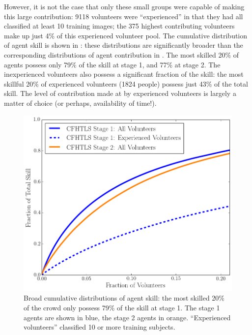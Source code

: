 \documentclass[useAMS,usenatbib,a4paper]{mn2e}
\begin{document}
However, it is not the case that only these small groups were capable of
making this large contribution: 9118 volunteers were ``experienced'' in that
they had all classified at least 10 training images; the 375 highest
contributing volunteers make up just 4\% of this experienced volunteer pool.
The cumulative distribution of agent skill is shown in
: these distributions are significantly broader
than the corresponding distributions of agent contribution in 
. The most skilled 20\% of agents possess only  79\%
of the skill at stage 1, and 77\% at stage 2. The inexperienced volunteers
also possess a significant fraction of the skill: the most skillful 20\% of
experienced volunteers (1824 people)  possess just 43\% of the total skill.
The level of contribution made at \sw by experienced volunteers is largely a
matter of choice (or perhaps, availability of time!).

\begin{figure}
\centering\includegraphics[width=0.9\linewidth]{sw-system-figs/crowd_skill_cumul.png}
\caption{Broad cumulative distributions of agent skill: 
the most skilled 20\% of the crowd only possess 79\% of the skill at stage 1.
The stage 1 agents
are shown in blue, the stage 2 agents in orange. ``Experienced volunteers''
classified 10 or more training subjects.}
\label{fig:crowd:cumulskillplot}
\end{figure}
\end{document}
